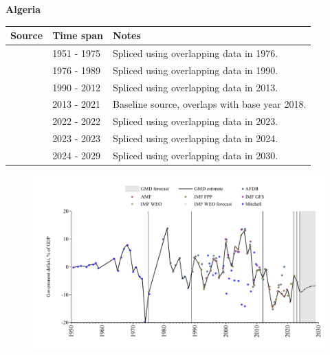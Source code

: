 \documentclass[12pt,a4paper,landscape]{article}
\begin{document}
\begin{adjustbox}{max totalsize={\paperwidth}{\paperheight},center}
\begin{minipage}[t][\textheight][t]{\textwidth}
\vspace*{0.5cm}
{}
\begin{center}
{\Large\bfseries Algeria}
\end{center}
\vspace{0.5cm}
\begin{table}[H]
\centering
\small
\begin{tabular}{|l|l|l|}
\hline
\textbf{Source} & \textbf{Time span} & \textbf{Notes} \\
\hline
\rowcolor{white}\cite{Mitchell}& 1951 - 1975 &Spliced using overlapping data in 1976.\\
\rowcolor{lightgray}\cite{AFDB}& 1976 - 1989 &Spliced using overlapping data in 1990.\\
\rowcolor{white}\cite{IMF_WEO}& 1990 - 2012 &Spliced using overlapping data in 2013.\\
\rowcolor{lightgray}\cite{AMF}& 2013 - 2021 &Baseline source, overlaps with base year 2018.\\
\rowcolor{white}\cite{IMF_WEO}& 2022 - 2022 &Spliced using overlapping data in 2023.\\
\rowcolor{lightgray}\cite{IMF_FPP}& 2023 - 2023 &Spliced using overlapping data in 2024.\\
\rowcolor{white}\cite{IMF_WEO_forecast}& 2024 - 2029 &Spliced using overlapping data in 2030.\\
\hline
\end{tabular}
\end{table}
\begin{figure}[H]
\centering
\includegraphics[width=\textwidth,height=0.6\textheight,keepaspectratio]{graphs/DZA_govdef_GDP.pdf}
\end{figure}
\end{minipage}
\end{adjustbox}
\end{document}
